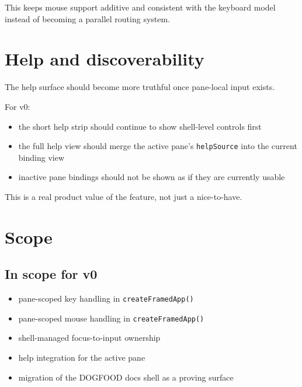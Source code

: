 This keeps mouse support additive and consistent with the keyboard model instead of becoming a parallel routing system.

\section{Help and discoverability}\label{record-044-help-and-discoverability}

The help surface should become more truthful once pane-local input exists.

For v0:

\begin{itemize}
\tightlist
\item
  the short help strip should continue to show shell-level controls first
\item
  the full help view should merge the active pane's \texttt{h\allowbreak{}e\allowbreak{}l\allowbreak{}p\allowbreak{}S\allowbreak{}o\allowbreak{}u\allowbreak{}r\allowbreak{}c\allowbreak{}e} into the current binding view
\item
  inactive pane bindings should not be shown as if they are currently usable
\end{itemize}

This is a real product value of the feature, not just a nice-to-have.

\section{Scope}\label{record-044-scope}

\subsection{In scope for v0}\label{record-044-in-scope-for-v0}

\begin{itemize}
\tightlist
\item
  pane-scoped key handling in \texttt{c\allowbreak{}r\allowbreak{}e\allowbreak{}a\allowbreak{}t\allowbreak{}e\allowbreak{}F\allowbreak{}r\allowbreak{}a\allowbreak{}m\allowbreak{}e\allowbreak{}d\allowbreak{}A\allowbreak{}p\allowbreak{}p\allowbreak{}(\allowbreak{})}
\item
  pane-scoped mouse handling in \texttt{c\allowbreak{}r\allowbreak{}e\allowbreak{}a\allowbreak{}t\allowbreak{}e\allowbreak{}F\allowbreak{}r\allowbreak{}a\allowbreak{}m\allowbreak{}e\allowbreak{}d\allowbreak{}A\allowbreak{}p\allowbreak{}p\allowbreak{}(\allowbreak{})}
\item
  shell-managed focus-to-input ownership
\item
  help integration for the active pane
\item
  migration of the DOGFOOD docs shell as a proving surface
\end{itemize}

